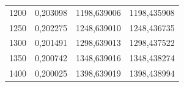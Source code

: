 \begin{table}[htbp]
\begin{tabular}{rrrr}
      1200 &   0,203098 & 1198,639006 & 1198,435908 \\

      1250 &   0,202275 & 1248,639010 & 1248,436735 \\

      1300 &   0,201491 & 1298,639013 & 1298,437522 \\

      1350 &   0,200742 & 1348,639016 & 1348,438274 \\

      1400 &   0,200025 & 1398,639019 & 1398,438994 \\
\hline
\end{tabular}  
\end{table}